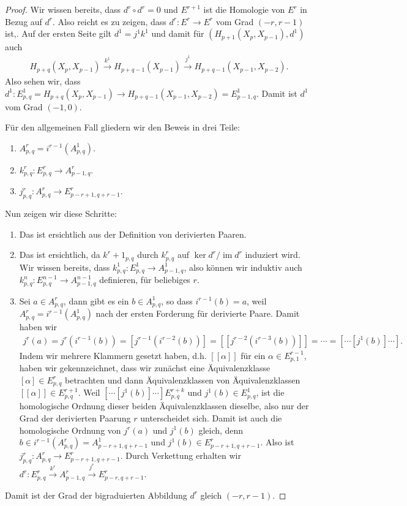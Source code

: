 \documentclass[12pt, hidelinks]{article}
\numberwithin{conj}{section}
\newcommand{\ima}{\operatorname{im}}
\begin{document}
\begin{proof}
Wir wissen bereits, dass $d^r \circ d^r = 0$ und $E^{r+1}$ ist die Homologie von $E^r$ in Bezug auf $d^r$. Also reicht es zu zeigen, dass $d^r: E^r \to E^r$ vom Grad $(-r,r-1)$ ist,. Auf der ersten Seite gilt $d^1=j^1k^1$ und damit für $(H_{p+1}(X_p,X_{p-1}), d^1)$ auch
\begin{align}
    H_{p+q}(X_p,X_{p-1}) \xrightarrow{k^1} H_{p+q-1}(X_{p-1}) \xrightarrow{j^1} H_{p+q-1}(X_{p-1},X_{p-2}).
\end{align}
Also sehen wir, dass $d^1: E^1_{p,q} = H_{p+q}(X_p,X_{p-1}) \to H_{p+q-1}(X_{p-1},X_{p-2}) = E^1_{p-1,q}$. Damit ist $d^1$ vom Grad $(-1,0)$.

Für den allgemeinen Fall gliedern wir den Beweis in drei Teile:
\begin{enumerate}[nolistsep]
    \item $A^r_{p,q} = i^{r-1}(A^1_{p,q})$.
    \item $k_{p,q}^r: E^r_{p,q} \to A^r_{p-1,q}$.
    \item $j_{p,q}^r: A^r_{p,q} \to E^r_{p-r+1,q+r-1}$.
\end{enumerate}
Nun zeigen wir diese Schritte:
\begin{enumerate}[nolistsep]
    \item Das ist ersichtlich aus der Definition von derivierten Paaren.
    \item Das ist ersichtlich, da $k^r+1_{p,q}$ durch $k^r_{p,q}$ auf $\ker d^r / \ima d^r$ induziert wird. Wir wissen bereits, dass $k^1_{p,q}: E^1_{p,q} \to A^1_{p-1,q}$, also können wir induktiv auch $k^{n}_{p,q}: E^{n-1}_{p,q} \to A^{n-1}_{p-1,q}$ definieren, für beliebiges $r$.
    \item Sei $a \in A^r_{p,q}$, dann gibt es ein $b \in A^1_{p,q}$, so dass $i^{r-1}(b) = a$, weil $A^r_{p,q} = i^{r-1}(A^1_{p,q})$ nach der ersten Forderung für derivierte Paare. Damit haben wir
    \begin{align}
    j^r(a)=j^r(i^{r-1}(b)) = [j^{r-1}(i^{r-2}(b))] = [[j^{r-2}(i^{r-3}(b))]] = \cdots = [\cdots[j^1(b)]\cdots].
    \end{align}
    Indem wir mehrere Klammern gesetzt haben, d.h. $[[\alpha]]$ für ein $\alpha \in E^{r-1}_{p,1}$, haben wir gekennzeichnet, dass wir zunächst eine Äquivalenzklasse $[\alpha] \in E^r_{p,q}$ betrachten und dann Äquivalenzklassen von Äquivalenzklassen $[[\alpha]] \in E^{r+1}_{p,q}$. Weil $[\cdots[j^1(b)]\cdots] E^{r+k}_{p,q}$ und $j^1(b) \in E^1_{p,q}$, ist die homologische Ordnung dieser beiden Äquivalenzklassen dieselbe, also nur der Grad der derivierten Paarung $r$ unterscheidet sich. Damit ist auch die homologische Ordnung von $j^r(a)$ und $j^1(b)$ gleich, denn $b \in i^{r-1}(A^r_{p,q}) = A^1_{p-r+1,q+r-1}$ und $j^1(b) \in E^r_{p-r+1,q+r-1}$. Also ist $j^r_{p,q}: A^r_{p,q} \to E^r_{p-r+1,q+r-1}$. Durch Verkettung erhalten wir $d^r: E^r_{p,q} \xrightarrow{k^r} A^r_{p-1,q} \xrightarrow{j^r} E^r_{p-r,q+r-1}$.
\end{enumerate}
Damit ist der Grad der bigraduierten Abbildung $d^r$ gleich $(-r,r-1)$.
\end{proof}
\end{document}
